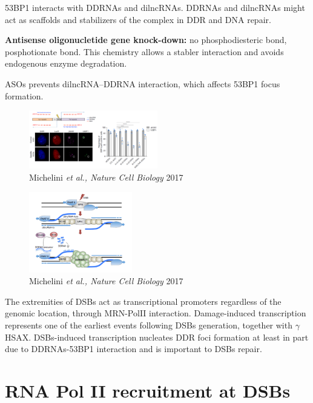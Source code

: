 53BP1 interacts with DDRNAs and dilncRNAs. DDRNAs and dilncRNAs might act as scaffolds and stabilizers of the complex in DDR and DNA repair.

\textbf{Antisense oligonucletide gene knock-down:} no phosphodiesteric bond, posphotionate bond. This chemistry allows a stabler interaction and avoids endogenous enzyme degradation. 

ASOs prevents dilncRNA--DDRNA interaction, which affects 53BP1 focus formation.

\begin{figure}
\centering
\includegraphics[width=0.5\textwidth]{Screen_Shot_2022-12-07_at_09-50-28.png}
\caption{Michelini \emph{et al., Nature Cell Biology} 2017}
\end{figure}

\begin{figure}
\centering
\includegraphics[width=0.4\textwidth]{Screen_Shot_2022-12-07_at_09-51-02.png}
\caption{Michelini \emph{et al., Nature Cell Biology} 2017}
\end{figure}

The extremities of DSBs act as transcriptional promoters regardless of the genomic location, through MRN-PolII interaction. Damage-induced transcription represents one of the earliest events following DSBs generation, together with \(\gamma\)HSAX. DSBs-induced transcription nucleates DDR foci formation at least in part due to DDRNAs-53BP1 interaction and is important to DSBs repair.

\hypertarget{rna-pol-ii-recruitment-at-dsbs}{%
\section{RNA Pol II recruitment at DSBs}\label{rna-pol-ii-recruitment-at-dsbs}}

